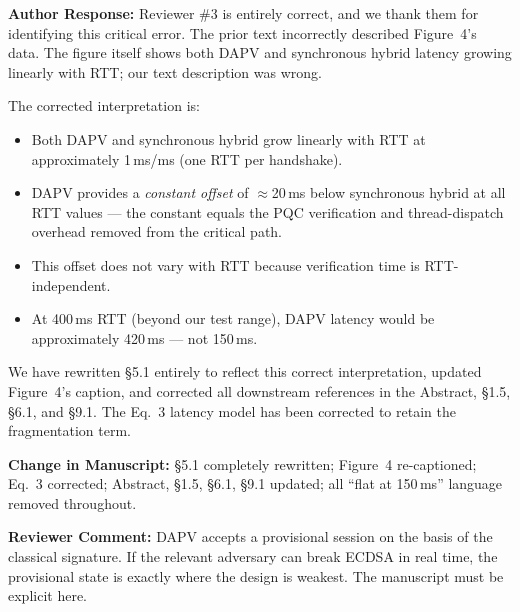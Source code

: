 \documentclass[12pt]{article}
\newcommand{\RC}[1]{\textcolor{reviewerblue}{\textbf{Reviewer Comment:}} #1}
\newcommand{\AR}[1]{\textcolor{replygreen}{\textbf{Author Response:}} #1}
\newcommand{\CH}[1]{\textcolor{changemagenta}{\textbf{Change in Manuscript:}} #1}
\begin{document}
\begin{replybox}
\AR{Reviewer \#3 is entirely correct, and we thank them for identifying
this critical error.  The prior text incorrectly described Figure~4's
data.  The figure itself shows both DAPV and synchronous hybrid latency
growing linearly with RTT; our text description was wrong.

The corrected interpretation is:
\begin{itemize}
  \item Both DAPV and synchronous hybrid grow linearly with RTT at
        approximately 1\,ms/ms (one RTT per handshake).
  \item DAPV provides a \emph{constant offset} of $\approx$20\,ms below
        synchronous hybrid at all RTT values — the constant equals
        the PQC verification and thread-dispatch overhead removed from the
        critical path.
  \item This offset does not vary with RTT because verification time is
        RTT-independent.
  \item At 400\,ms RTT (beyond our test range), DAPV latency would be
        approximately 420\,ms — not 150\,ms.
\end{itemize}

We have rewritten \S5.1 entirely to reflect this correct interpretation,
updated Figure~4's caption, and corrected all downstream references in the
Abstract, \S1.5, \S6.1, and \S9.1.  The Eq.~3 latency model has been
corrected to retain the fragmentation term.}

\CH{\S5.1 completely rewritten; Figure~4 re-captioned; Eq.~3 corrected;
Abstract, \S1.5, \S6.1, \S9.1 updated; all ``flat at 150\,ms'' language
removed throughout.}
\end{replybox}

\begin{reviewbox}
\RC{DAPV accepts a provisional session on the basis of the classical signature.
If the relevant adversary can break ECDSA in real time, the provisional state
is exactly where the design is weakest.  The manuscript must be explicit here.}
\end{reviewbox}
\end{document}
